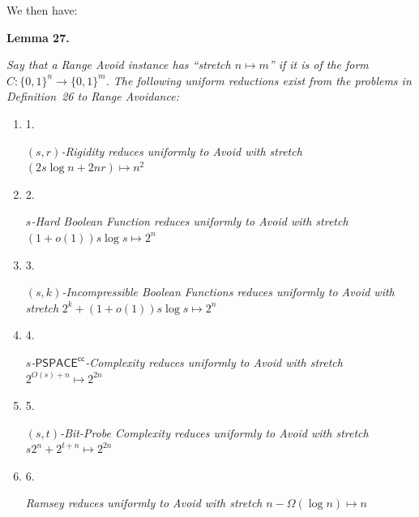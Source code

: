 


We then have:\par





\par\medskip\noindent\textbf{
\textbf{Lemma 27}\textbf{.}
}\par



\emph{Say that a Range Avoid instance has “stretch $n\mapsto m$” if it is of the form $C:\{0,1\}^{n}\to\{0,1\}^{m}$. The following uniform reductions exist from the problems in Definition 26 to Range Avoidance:}\par


\begin{enumerate}


\item[] 
1. 


$(s,r)$\emph{-Rigidity reduces uniformly to Avoid with stretch }$(2s\log n+2nr)\mapsto n^{2}$\emph{}\par





\item[] 
2. 


$s$\emph{-Hard Boolean Function reduces uniformly to Avoid with stretch }$(1+o(1))s\log s\mapsto 2^{n}$\emph{}\par





\item[] 
3. 


$(s,k)$\emph{-Incompressible Boolean Functions reduces uniformly to Avoid with stretch }$2^{k}+(1+o(1))s\log s\mapsto 2^{n}$\emph{}\par





\item[] 
4. 


$s$\emph{-}${\mathsf{PSPACE}}^{{\mathsf{cc}}}$\emph{-Complexity reduces uniformly to Avoid with stretch }$2^{O(s)+n}\mapsto 2^{2n}$\emph{}\par





\item[] 
5. 


$(s,t)$\emph{-Bit-Probe Complexity reduces uniformly to Avoid with stretch }$s2^{n}+2^{t+n}\mapsto 2^{2n}$\emph{}\par





\item[] 
6. 


\emph{Ramsey reduces uniformly to Avoid with stretch }$n-\Omega(\log n)\mapsto n$\emph{}\par





\end{enumerate}



